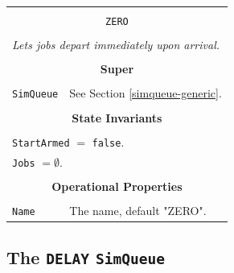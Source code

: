 \documentclass[12pt]{book}
\begin{document}
\begin{tabular}{|l|l|l|}
\hline
\multicolumn{3}{|c|}{} \\
\multicolumn{3}{|c|}{\lstinline[basicstyle=\large]{ZERO}} \\
\multicolumn{3}{|c|}{} \\
\hline
\multicolumn{3}{|l|}{\em Lets jobs depart immediately upon arrival.} \\
\hline
\multicolumn{3}{|c|}{} \\
\multicolumn{3}{|c|}{\bf Super} \\
\multicolumn{3}{|c|}{} \\
\hline
\lstinline|SimQueue| & \multicolumn{2}{|l|}{See Section \ref{simqueue-generic}.} \\
\hline
\multicolumn{3}{|c|}{} \\
\multicolumn{3}{|c|}{\bf State  Invariants} \\
\multicolumn{3}{|c|}{} \\
\hline
\multicolumn{3}{|l|}{\lstinline|StartArmed| $=$ \lstinline|false|.} \\
\multicolumn{3}{|l|}{\lstinline|Jobs| $= \emptyset$.} \\
\hline
\multicolumn{3}{|c|}{} \\
\multicolumn{3}{|c|}{\bf Operational Properties} \\
\multicolumn{3}{|c|}{} \\
\hline
\lstinline|Name|      & \multicolumn{2}{|l|}{The name, default "ZERO".} \\
\hline
\end{tabular}

\subsection{The \lstinline{DELAY} \lstinline{SimQueue}}
\end{document}

